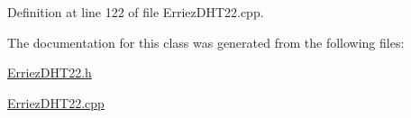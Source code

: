 Definition at line 122 of file Erriez\+D\+H\+T22.\+cpp.



The documentation for this class was generated from the following files\+:\begin{DoxyCompactItemize}
\item 
\hyperlink{_erriez_d_h_t22_8h}{Erriez\+D\+H\+T22.\+h}\item 
\hyperlink{_erriez_d_h_t22_8cpp}{Erriez\+D\+H\+T22.\+cpp}\end{DoxyCompactItemize}
